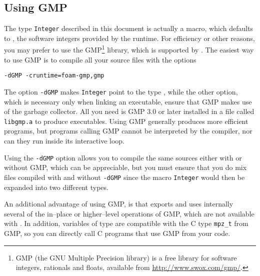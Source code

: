 \subsection{Using GMP}
The type {\tt Integer} described in this document is actually a macro,
which defaults to , the software integers provided
by the \aldor{} runtime. For efficiency or other reasons, you may prefer
to use the GMP\footnote{GMP (the GNU Multiple Precision library) is
a free library for software integers, rationals and floats, available
from \url{http://www.swox.com/gmp/}.}
library, which is supported by \libaldor. The easiest way
to use GMP is to compile all your source files with the options
\begin{center}
{\tt -dGMP -cruntime=foam-gmp,gmp}
\end{center}
The option {\tt -dGMP} makes {\tt Integer} point to the type
, while the other option, which is necessary
only when linking an executable, ensure that GMP makes use
of the \aldor{} garbage collector. All you need is GMP 3.0 or later
installed in a file called {\tt libgmp.a} to produce executables.
Using GMP generally produces more efficient programs,
but programs calling GMP cannot be interpreted by the \aldor{}
compiler, nor can they run inside its interactive loop.

Using the {\tt -dGMP} option allows you to compile the same sources
either with or without GMP, which can be appreciable, but you must
ensure that you do mix files compiled with and without {\tt -dGMP} since
the macro {\tt Integer} would then be expanded into two different types.

An additional advantage of using GMP, is that 
exports and uses internally several of the in--place or higher--level
operations of GMP, which are not available with .
In addition, variables of type  are compatible
with the C type {\tt mpz\_t} from GMP, so you can directly call
C programs that use GMP from your \aldor{} code.

